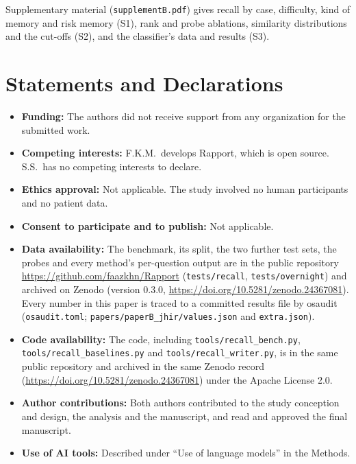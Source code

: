 \documentclass[sn-mathphys-num]{sn-jnl}
\begin{document}
\backmatter

Supplementary material (\texttt{supplementB.pdf}) gives recall by case, difficulty, kind of memory and risk memory (S1), rank and probe ablations,
similarity distributions and the cut-offs (S2), and the classifier's data and results (S3).

\section*{Statements and Declarations}
\begin{itemize}
\item \textbf{Funding:} The authors did not receive support from any organization for the submitted work.
\item \textbf{Competing interests:} F.K.M.\ develops Rapport, which is open source. S.S.\ has no competing interests to declare.
\item \textbf{Ethics approval:} Not applicable. The study involved no human participants and no patient data.
\item \textbf{Consent to participate and to publish:} Not applicable.
\item \textbf{Data availability:} The benchmark, its split, the two further test sets, the probes and every method's per-question output are
in the public repository \url{https://github.com/faazkhn/Rapport} (\texttt{tests/recall}, \texttt{tests/overnight}) and archived on Zenodo
(version 0.3.0, \url{https://doi.org/10.5281/zenodo.24367081}). Every number in this paper is traced to a committed results file by osaudit
(\texttt{osaudit.toml}; \texttt{papers/paperB\_jhir/values.json} and \texttt{extra.json}).
\item \textbf{Code availability:} The code, including \texttt{tools/recall\_bench.py}, \texttt{tools/recall\_baselines.py} and
\texttt{tools/recall\_writer.py}, is in the same public repository and archived in the same Zenodo record (\url{https://doi.org/10.5281/zenodo.24367081}) under the Apache
License 2.0.
\item \textbf{Author contributions:} Both authors contributed to the study conception and design, the analysis and the manuscript, and
read and approved the final manuscript.
\item \textbf{Use of AI tools:} Described under ``Use of language models'' in the Methods.
\end{itemize}


\end{document}
